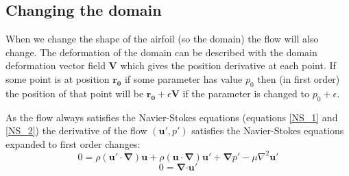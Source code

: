 \documentclass[12pt, a4paper]{article}
\begin{document}
    \subsection{Changing the domain}
    When we change the shape of the airfoil (so the domain) the flow will also change. The deformation of the domain can be described with the domain deformation vector field $\mathbf{V}$ which gives the position derivative at each point. If some point is at position $\mathbf{r_0}$ if some parameter has value $p_0$ then (in first order) the position of that point will be $\mathbf{r_0} + \epsilon \mathbf{V}$ if the parameter is changed to $p_0 + \epsilon$.
    
    As the flow always satisfies the Navier-Stokes equations (equations \ref{NS_1} and \ref{NS_2}) the derivative of the flow $(\mathbf{u'}, p')$ satisfies the Navier-Stokes equations expanded to first order changes:
    \begin{equation} \label{NS_der_1}
    0 = \rho (\mathbf{u' \cdot} \boldsymbol{\nabla}) \mathbf{u} + 
    \rho (\mathbf{u \cdot} \boldsymbol{\nabla}) \mathbf{u'} + 
    \boldsymbol{\nabla} p' - 
    \mu \nabla^2 \mathbf{u'}
    \end{equation}
    \begin{equation} \label{NS_der_2}
    0 = \boldsymbol{\nabla} \mathbf{\cdot u'}
    \end{equation}
    
\end{document}
